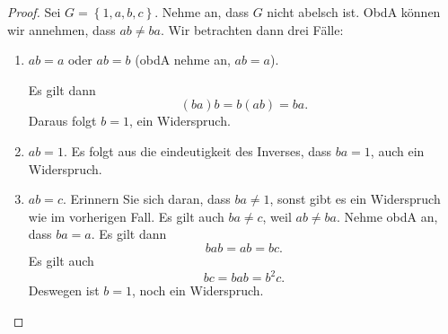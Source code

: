 \begin{proof}
	Sei $G=\left\{ 1,a,b,c \right\} $. Nehme an, dass $G$ nicht abelsch ist. ObdA können wir annehmen, dass $ab\neq ba$. Wir betrachten dann drei Fälle:
	\begin{enumerate}
		\item $ab=a$ oder $ab=b$ (obdA nehme an, $ab=a$).

			Es gilt dann
			\[
				(ba)b=b(ab)=ba
			.\] 
			Daraus folgt $b=1$, ein Widerspruch.

		\item $ab=1$. Es folgt aus die eindeutigkeit des Inverses, dass $ba=1$, auch ein Widerspruch.

		\item $ab=c$. Erinnern Sie sich daran, dass $ba\neq 1$, sonst gibt es ein Widerspruch wie im vorherigen Fall. Es gilt auch $ba\neq c$, weil $ab\neq ba$. Nehme obdA an, dass $ba=a$. Es gilt dann
			\[
			bab=ab=bc
			.\] 
			Es gilt auch
			\[
			bc=bab=b^2c
			.\] 
			Deswegen ist $b=1$, noch ein Widerspruch.
	\end{enumerate}
\end{proof}
